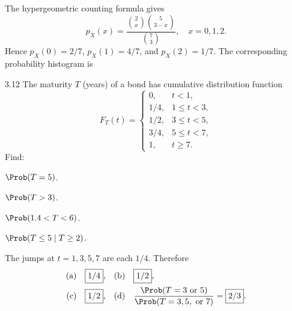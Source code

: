 \documentclass[11pt,oneside]{article}
\begin{document}
\begin{solution}
The hypergeometric counting formula gives
\[
p_X(x)=\frac{\binom{2}{x}\binom{5}{3-x}}{\binom{7}{3}},\quad x=0,1,2.
\]
Hence $p_X(0)=2/7$, $p_X(1)=4/7$, and $p_X(2)=1/7$. The corresponding probability histogram is
\begin{center}
\end{center}
\end{solution}

\begin{exercise}{3.12}
The maturity $T$ (years) of a bond has cumulative distribution function
\[
F_T(t)=\begin{cases}
0,&t<1,\\1/4,&1\le t<3,\\1/2,&3\le t<5,\\3/4,&5\le t<7,\\1,&t\ge7.
\end{cases}
\]
Find:
\begin{exercisesubparts}
\item $\Prob(T=5)$.
\item $\Prob(T>3)$.
\item $\Prob(1.4<T<6)$.
\item $\Prob(T\le5\mid T\ge2)$.
\end{exercisesubparts}
\end{exercise}

\begin{solution}
The jumps at $t=1,3,5,7$ are each $1/4$. Therefore
\begin{align*}
\textup{(a)}\quad&\boxed{1/4},&
\textup{(b)}\quad&\boxed{1/2},\\
\textup{(c)}\quad&\boxed{1/2},&
\textup{(d)}\quad&\frac{\Prob(T=3\text{ or }5)}{\Prob(T=3,5,\text{ or }7)}=\boxed{2/3}.
\end{align*}
\end{solution}
\end{document}
